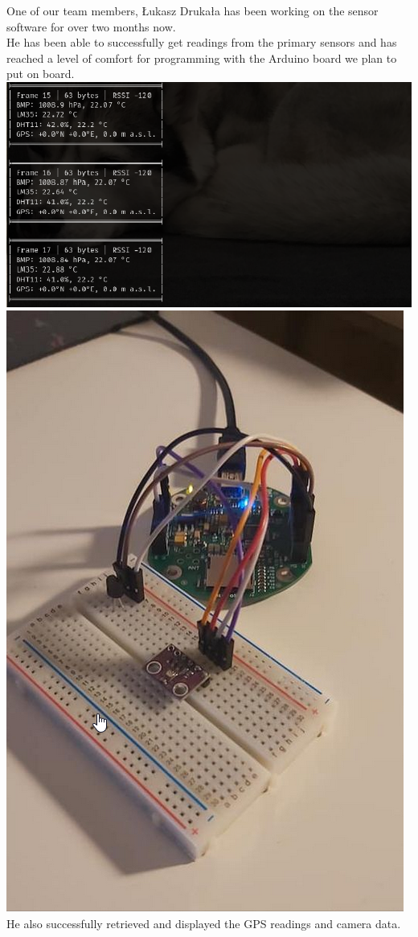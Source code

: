 \documentclass[class=report, crop=false]{standalone}
\begin{document}
One of our team members, Łukasz Drukała has been working on the sensor software for over two months now. \\
He has been able to successfully get readings from the primary sensors and has reached a level of comfort for programming
with the Arduino board we plan to put on board. \\
\includegraphics[width=\columnwidth]{ext/gpsreadings.png}
\includegraphics[width=\columnwidth]{ext/primaryboard.png}
He also successfully retrieved and displayed the GPS readings and camera data. \\
\end{document}
